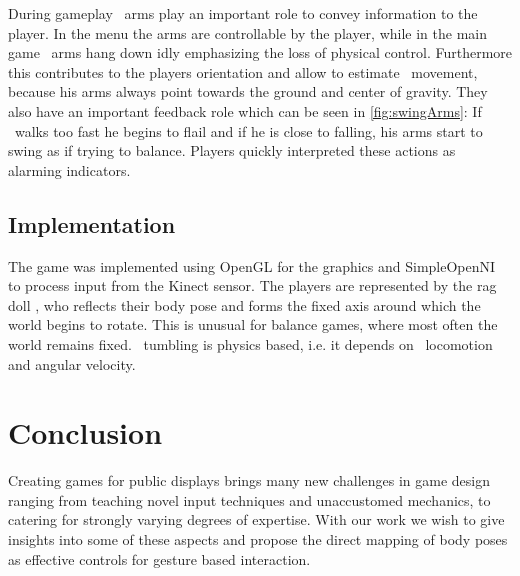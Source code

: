 \documentclass{chi-ext}
\begin{document}
During gameplay \eds\ arms play an important role to convey information to the player. In the menu the arms are controllable by the player, while in the main game \eds\ arms hang down idly emphasizing the loss of physical control. Furthermore this contributes to the players orientation and allow to estimate \eds\ movement, because his arms always point towards the ground and center of gravity. They also have an important feedback role which can be seen in \autoref{fig:swingArms}: If \ed\ walks too fast he begins to flail and if he is close to falling, his arms start to swing as if trying to balance. Players quickly interpreted these actions as alarming indicators.
\subsection{Implementation}
The game was implemented using OpenGL for the graphics and SimpleOpenNI to process input from the Kinect sensor. The players are represented by the rag doll \ed, who reflects their body pose and forms the fixed axis around which the world begins to rotate. This is unusual for balance games, where most often the world remains fixed. \eds\ tumbling is physics based, i.e. it depends on \eds\ locomotion and angular velocity.
%
\section{Conclusion}
%
Creating games for public displays brings many new challenges in game design ranging from teaching novel input techniques and unaccustomed mechanics, to catering for strongly varying degrees of expertise. With our work we wish to give insights into some of these aspects and propose the direct mapping of body poses as effective controls for gesture based interaction. 
\end{document}
